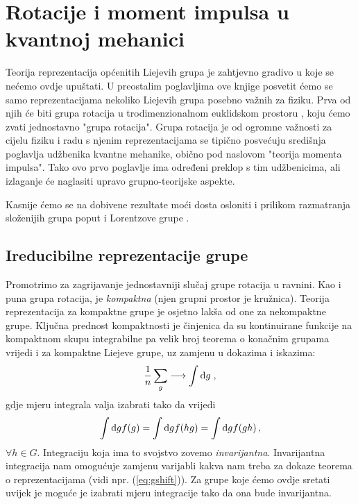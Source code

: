 
\chapter{Rotacije i moment impulsa u kvantnoj mehanici}
\label{ch:rotacije}

Teorija reprezentacija općenitih Liejevih grupa je zahtjevno
gradivo u koje se nećemo ovdje upuštati. U preostalim
poglavljima ove knjige posvetit ćemo se samo
reprezentacijama nekoliko Liejevih grupa posebno važnih
za fiziku. Prva od njih će biti grupa rotacija u trodimenzionalnom
euklidskom prostoru , koju ćemo  zvati
jednostavno "grupa rotacija". Grupa rotacija je od ogromne
važnosti za cijelu fiziku i radu s njenim reprezentacijama
se tipično posvećuju središnja poglavlja udžbenika kvantne mehanike,
obično pod naslovom "teorija momenta impulsa".
Tako ovo prvo poglavlje ima određeni preklop s tim udžbenicima, ali
izlaganje će naglasiti upravo grupno-teorijske aspekte.

Kasnije ćemo se na dobivene rezultate moći dosta osloniti i
prilikom razmatranja složenijih grupa poput  i
Lorentzove grupe .

\section{Ireducibilne reprezentacije grupe }

Promotrimo za zagrijavanje jednostavniji slučaj grupe 
rotacija u ravnini. Kao i puna grupa rotacija,  je
\emph{kompaktna} (njen grupni prostor je kružnica).
Teorija reprezentacija za kompaktne grupe je osjetno lakša
 od one za nekompaktne grupe.
Ključna prednost kompaktnosti je činjenica da su kontinuirane funkcije
na kompaktnom skupu integrabilne pa 
velik broj teorema o konačnim grupama vrijedi i za kompaktne Liejeve
grupe, uz zamjenu u dokazima i iskazima:
\begin{equation}
    \frac{1}{n} \sum_{g} \longrightarrow \int \textrm{d} g \;,
\end{equation}
gdje mjeru integrala valja izabrati tako da vrijedi
\begin{equation}
  \int \textrm{d} g f(g) = \int \textrm{d} g f(hg) = \int \textrm{d} g f(gh) \,,
\end{equation}
$\forall h \in G$.
Integraciju koja ima to svojstvo zovemo \emph{invarijantna}.  
Invarijantna integracija nam omogućuje zamjenu
varijabli kakva nam treba za dokaze teorema o reprezentacijama
(vidi npr. (\ref{eq:gshift})).
Za grupe koje ćemo ovdje sretati uvijek je moguće je izabrati
mjeru integracije tako da ona bude invarijantna.

